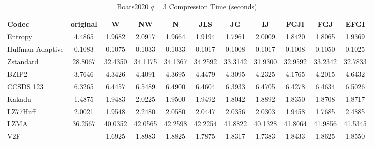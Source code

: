 \documentclass{article}
\begin{document}
\begin{table}[h!]
\centering
\caption{Boats2020 $q=3$ Compression Time (seconds)}
\begin{tabular}{|l|cccccccccc|}
\hline
Codec &  original &       W &      NW &       N &     JLS &      JG &      IJ &    FGJI &     FGJ &    EFGI \\
\hline
Entropy & 4.4865 & 1.9682 & 2.0917 & 1.9664 & 1.9194 & 1.7961 & 2.0009 & 1.8420 & 1.8065 & 1.9369         \\
\hline
Huffman Adaptive &    0.1083 &  0.1075 &  0.1033 &  0.1033 &  0.1017 &  0.1008 &  0.1017 &  0.1008 &  0.1050 &  0.1025 \\
Zstandard        &   28.8067 & 32.4350 & 34.1175 & 34.1367 & 34.2592 & 33.3142 & 31.9300 & 32.9592 & 33.2342 & 32.7833 \\
BZIP2            &    3.7646 &  4.3426 &  4.4091 &  4.3695 &  4.4479 &  4.3095 &  4.2325 &  4.1765 &  4.2015 &  4.6432 \\
CCSDS 123        &    6.3265 &  6.4457 &  6.5489 &  6.4900 &  6.4604 &  6.3933 &  6.4705 &  6.4278 &  6.4634 &  6.5026 \\
Kakadu           &    1.4875 &  1.9483 &  2.0225 &  1.9500 &  1.9492 &  1.8042 &  1.8892 &  1.8350 &  1.8708 &  1.8717 \\
LZ77Huff         &    2.0021 &  1.9548 &  2.2480 &  2.0580 &  2.0447 &  2.0356 &  2.0303 &  1.9458 &  1.7685 &  2.4885 \\
LZMA             &   36.2567 & 40.0352 & 42.0565 & 42.2598 & 42.2254 & 41.8822 & 40.1328 & 41.8064 & 41.9856 & 41.5345 \\
V2F              &    - &  1.6925 &  1.8983 &  1.8825 &  1.7875 &  1.8317 &  1.7383 &  1.8433 &  1.8625 &  1.8550 \\
\hline
\end{tabular}
\end{table}

\newpage
\end{document}
